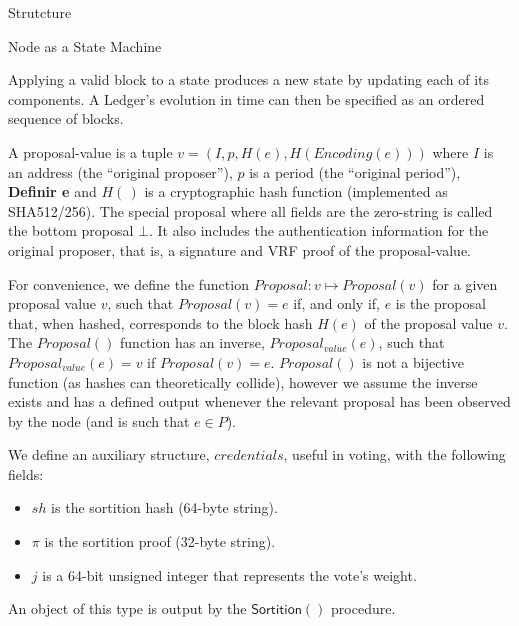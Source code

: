 \documentclass[10pt,a4paper]{article}
\begin{document}
\begin{section}{Strutcture}
\begin{subsection}{Node as a State Machine}

Applying a valid block to a state produces a new state by updating each of its components.
A Ledger's evolution in time can then be specified as an ordered sequence of blocks.

A proposal-value is a tuple $v = (I, p, H(e), H(Encoding(e)))$ where 
$I$ is an address (the ``original proposer''), 
$p$ is a period (the ``original period''), 
{\bf Definir e}
and
$H(\,)$ is a cryptographic hash function (implemented as SHA512/256). 
The special proposal where all fields are the zero-string is called the bottom 
proposal $\bot$. 
It also includes the authentication information for the original proposer, that is, 
a signature and VRF proof of the proposal-value.


For convenience, we define the function $Proposal:v\mapsto{Proposal}(v)$ for a given proposal value 
$v$,  such that $Proposal(v) = e$ if, and only if, $e$ is the proposal that, when hashed, corresponds 
to the block hash $H(e)$ of the proposal value $v$. 
The $Proposal()$ function has an inverse, $Proposal_{value}(e)$, such that
$Proposal_{value}(e) = v$ if $Proposal(v) = e$.
$Proposal()$ is not a bijective function (as hashes can theoretically collide), however we assume the inverse
exists and has a defined output whenever the relevant proposal has been observed by the node
(and is such that $e \in P$).



We define an auxiliary structure, $credentials$, useful in voting, with the following fields:
\begin{itemize}
    \item $sh$ is the sortition hash (64-byte string).
    \item $\pi$ is the sortition proof (32-byte string).
    \item $j$ is a 64-bit unsigned integer that represents the vote's weight.
\end{itemize}
An object of this type is output by the $\mathsf{Sortition}()$ procedure.


\end{subsection}
\end{section}
\end{document}
